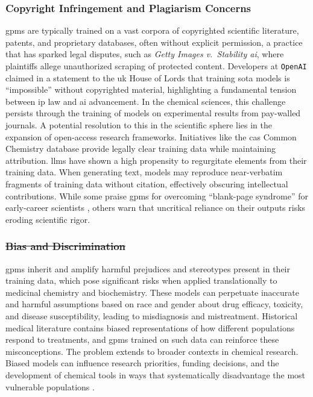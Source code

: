 \documentclass[11pt, oneside]{article}
\makeatletter
\newcommand{\modelname}[1]{\texttt{#1}}
\providecommand{\DIFaddtex}[1]{{\protect\color{blue}\uwave{#1}}} %
\providecommand{\DIFdeltex}[1]{{\protect\color{red}\sout{#1}}} %
\providecommand{\DIFaddbegin}{} %
\providecommand{\DIFaddend}{} %
\providecommand{\DIFdelbegin}{} %
\providecommand{\DIFdelend}{} %
\providecommand{\DIFadd}[1]{\texorpdfstring{\DIFaddtex{#1}}{#1}} %
\providecommand{\DIFdel}[1]{\texorpdfstring{\DIFdeltex{#1}}{}} %
\newcommand{\DIFscaledelfig}{0.5}
\newlength{\DIFdelgraphicswidth} %
\newlength{\DIFdelgraphicsheight} %
\newcommand{\DIFaddincludegraphics}[2][]{{\color{blue}\fbox{\DIFOincludegraphics[#1]{#2}}}} %
\newcommand{\DIFdelincludegraphics}[2][]{%
\sbox{\DIFdelgraphicsbox}{\DIFOincludegraphics[#1]{#2}}%
\settoboxwidth{\DIFdelgraphicswidth}{\DIFdelgraphicsbox} %
\settoboxtotalheight{\DIFdelgraphicsheight}{\DIFdelgraphicsbox} %
\scalebox{\DIFscaledelfig}{%
\parbox[b]{\DIFdelgraphicswidth}{\usebox{\DIFdelgraphicsbox}\\[-\baselineskip] \rule{\DIFdelgraphicswidth}{0em}}\llap{\resizebox{\DIFdelgraphicswidth}{\DIFdelgraphicsheight}{%
\setlength{\unitlength}{\DIFdelgraphicswidth}%
\begin{picture}(1,1)%
\thicklines\linethickness{2pt} %
{\color[rgb]{1,0,0}\put(0,0){\framebox(1,1){}}}%
{\color[rgb]{1,0,0}\put(0,0){\line( 1,1){1}}}%
{\color[rgb]{1,0,0}\put(0,1){\line(1,-1){1}}}%
\end{picture}%
}\hspace*{3pt}}} %
} %
\DeclareRobustCommand{\DIFaddbegin}{\DIFOaddbegin \let\includegraphics\DIFaddincludegraphics} %
\DeclareRobustCommand{\DIFaddend}{\DIFOaddend \let\includegraphics\DIFOincludegraphics} %
\DeclareRobustCommand{\DIFdelbegin}{\DIFOdelbegin \let\includegraphics\DIFdelincludegraphics} %
\DeclareRobustCommand{\DIFdelend}{\DIFOaddend \let\includegraphics\DIFOincludegraphics} %
\let\sout@orig\sout %
\renewcommand{\sout}[1]{\ifmmode\text{\sout@orig{\ensuremath{#1}}}\else\sout@orig{#1}\fi} %
\makeatother
\begin{document}
\subsubsection{Copyright Infringement and Plagiarism Concerns}

\glspl{gpm} are typically trained on a vast corpora of copyrighted scientific literature, patents, and proprietary databases, often without explicit permission, a practice that has sparked legal disputes, such as \textit{Getty Images v.\ Stability \gls{ai}}, where plaintiffs allege unauthorized scraping of protected content. \autocite{kirchhubel2024intellectual} Developers at \modelname{OpenAI} claimed in a statement to the \gls{uk} House of Lords that training \gls{sota} models is \enquote{impossible} without copyrighted material, highlighting a fundamental tension between \gls{ip} law and \gls{ai} advancement. \autocite{openai2023written} 
In the chemical sciences, this challenge persists through the training of models on experimental results from pay-walled journals. 
A potential resolution to this in the scientific sphere lies in the expansion of open-access research frameworks. 
Initiatives like the \gls{cas} Common Chemistry database provide legally clear training data while maintaining attribution.
\glspl{llm} have shown a high propensity to regurgitate elements from their training data. 
When generating text, models may reproduce near-verbatim fragments of training data without citation, effectively obscuring intellectual contributions.\autocite{bender2021dangers} 
While some praise \glspl{gpm} for overcoming \enquote{blank-page syndrome} for early-career scientists \autocite{altmae2023artificial}, others warn that uncritical reliance on their outputs risks eroding scientific rigor.\autocite{donker2023dangers}


\subsubsection{\DIFdelbegin \DIFdel{Bias and Discrimination}\DIFdelend \DIFaddbegin \DIFadd{Biases}\DIFaddend }

\glspl{gpm} inherit and amplify harmful prejudices and stereotypes present in their training data, which pose significant risks when applied translationally to medicinal chemistry and biochemistry. \autocite{spotte-smith2025considering, yang2024demographic, omiye2023large} 
These models can perpetuate inaccurate and harmful assumptions based on race and gender about drug efficacy, toxicity, and disease susceptibility, leading to misdiagnosis and mistreatment. \autocite{chen2023algorithmic} 
Historical medical literature contains biased representations of how different populations respond to treatments, and \glspl{gpm} trained on such data can reinforce these misconceptions. \autocite{mittermaier2023bias}
The problem extends to broader contexts in chemical research. 
Biased models can influence research priorities, funding decisions, and the development of chemical tools in ways that systematically disadvantage the most vulnerable populations \autocite{dotan2019value0laden}. 
\end{document}
